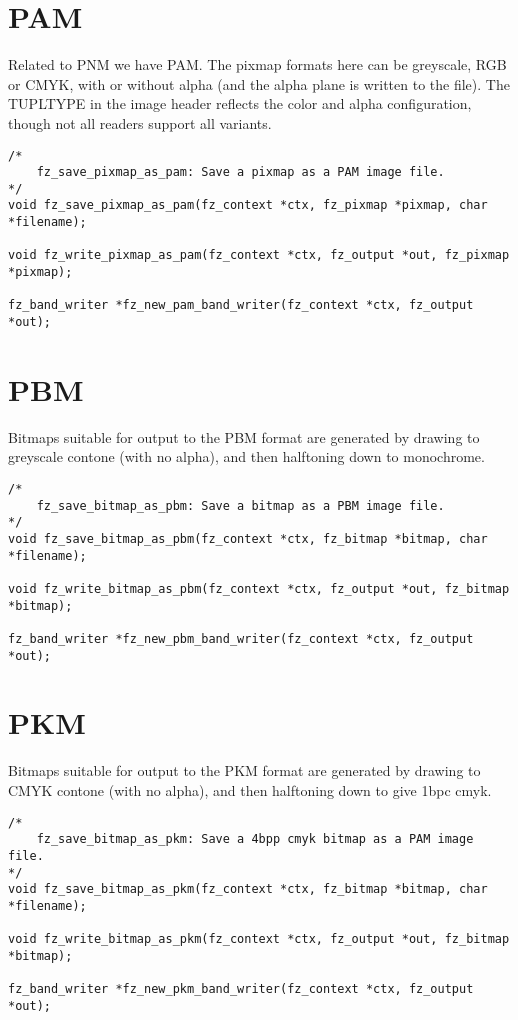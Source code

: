 \documentclass[oneside]{book}
\begin{document}
\section{PAM}

Related to PNM we have PAM. The pixmap formats here can be greyscale, RGB or CMYK, with or without alpha (and the alpha plane is written to the file). The TUPLTYPE in the image header reflects the color and alpha configuration, though not all readers support all variants.

\begin{lstlisting}
/*
	fz_save_pixmap_as_pam: Save a pixmap as a PAM image file.
*/
void fz_save_pixmap_as_pam(fz_context *ctx, fz_pixmap *pixmap, char *filename);

void fz_write_pixmap_as_pam(fz_context *ctx, fz_output *out, fz_pixmap *pixmap);

fz_band_writer *fz_new_pam_band_writer(fz_context *ctx, fz_output *out);
\end{lstlisting}

\section{PBM}

Bitmaps suitable for output to the PBM format are generated by drawing to greyscale contone (with no alpha), and then halftoning down to monochrome.

\begin{lstlisting}
/*
	fz_save_bitmap_as_pbm: Save a bitmap as a PBM image file.
*/
void fz_save_bitmap_as_pbm(fz_context *ctx, fz_bitmap *bitmap, char *filename);

void fz_write_bitmap_as_pbm(fz_context *ctx, fz_output *out, fz_bitmap *bitmap);

fz_band_writer *fz_new_pbm_band_writer(fz_context *ctx, fz_output *out);
\end{lstlisting}

\section{PKM}

Bitmaps suitable for output to the PKM format are generated by drawing to CMYK contone (with no alpha), and then halftoning down to give 1bpc cmyk.

\begin{lstlisting}
/*
	fz_save_bitmap_as_pkm: Save a 4bpp cmyk bitmap as a PAM image file.
*/
void fz_save_bitmap_as_pkm(fz_context *ctx, fz_bitmap *bitmap, char *filename);

void fz_write_bitmap_as_pkm(fz_context *ctx, fz_output *out, fz_bitmap *bitmap);

fz_band_writer *fz_new_pkm_band_writer(fz_context *ctx, fz_output *out);
\end{lstlisting}
\end{document}
